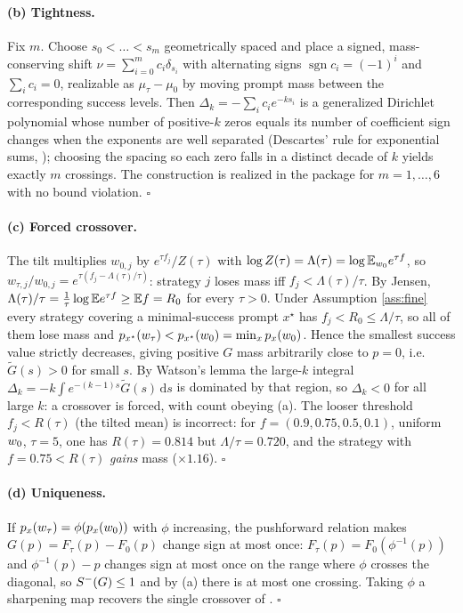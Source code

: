 \paragraph{(b) Tightness.}
Fix $m$. Choose $s_0<\dots<s_m$ geometrically spaced and place a signed,
mass-conserving shift $\nu=\sum_{i=0}^m c_i\delta_{s_i}$ with alternating signs
$\operatorname{sgn}c_i=(-1)^i$ and $\sum_i c_i=0$, realizable as
$\mu_\tau-\mu_0$ by moving prompt mass between the corresponding success levels.
Then $\Delta_k=-\sum_i c_i e^{-k s_i}$ is a generalized Dirichlet polynomial whose
number of positive-$k$ zeros equals its number of coefficient sign changes when
the exponents are well separated (Descartes' rule for exponential sums,
\citep{jameson06descartes}); choosing the spacing so each zero falls in a
distinct decade of $k$ yields exactly $m$ crossings. The construction is realized
in the package for $m=1,\dots,6$ with no bound violation. $\square$

\paragraph{(c) Forced crossover.}
The tilt multiplies $w_{0,j}$ by $e^{\tau f_j}/Z(\tau)$ with $\log
Z(\tau)=\Lambda(\tau)=\log\mathbb{E}_{w_0}e^{\tau f}$, so $w_{\tau,j}/w_{0,j}
=e^{\tau(f_j-\Lambda(\tau)/\tau)}$: strategy $j$ loses mass iff
$f_j<\Lambda(\tau)/\tau$. By Jensen, $\Lambda(\tau)/\tau=\tfrac1\tau\log\mathbb{E}
e^{\tau f}\ge\mathbb{E} f=R_0$ for every $\tau>0$. Under Assumption \ref{ass:fine} every
strategy covering a minimal-success prompt $x^\star$ has $f_j<R_0\le\Lambda/\tau$,
so all of them lose mass and $p_{x^\star}(w_\tau)<p_{x^\star}(w_0)=\min_x
p_x(w_0)$. Hence the smallest success value strictly decreases, giving positive
$G$ mass arbitrarily close to $p=0$, i.e.\ $\tilde G(s)>0$ for small $s$. By
Watson's lemma the large-$k$ integral
$\Delta_k=-k\int e^{-(k-1)s}\tilde G(s)\,\mathrm ds$ is dominated by that region,
so $\Delta_k<0$ for all large $k$: a crossover is forced, with count obeying (a).
The looser threshold $f_j<R(\tau)$ (the tilted mean) is incorrect: for
$f=(0.9,0.75,0.5,0.1)$, uniform $w_0$, $\tau=5$, one has $R(\tau)=0.814$ but
$\Lambda/\tau=0.720$, and the strategy with $f=0.75<R(\tau)$ \emph{gains} mass
($\times1.16$). $\square$

\paragraph{(d) Uniqueness.}
If $p_x(w_\tau)=\phi(p_x(w_0))$ with $\phi$ increasing, the pushforward relation
makes $G(p)=F_\tau(p)-F_0(p)$ change sign at most once: $F_\tau(p)=F_0(\phi^{-1}(p))$
and $\phi^{-1}(p)-p$ changes sign at most once on the range where $\phi$ crosses
the diagonal, so $S^{-}(G)\le1$ and by (a) there is at most one crossing. Taking
$\phi$ a sharpening map recovers the single crossover of
\citep{yangchen2026kernel}. $\square$

